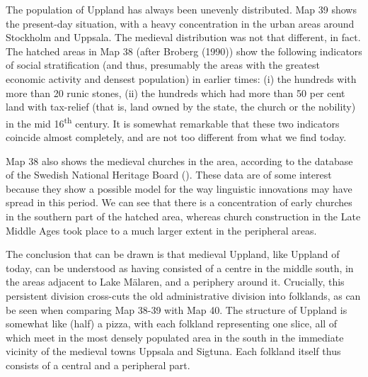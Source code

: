 The population of Uppland has always been unevenly distributed. Map 39 shows the present-day situation, with a heavy concentration in the urban areas around Stockholm and Uppsala. The medieval distribution was not that different, in fact. The hatched areas in Map 38 (after Broberg (1990)) show the following indicators of social stratification (and thus, presumably the areas with the greatest economic activity and densest population) in earlier times: (i) the hundreds with more than 20 runic stones, (ii) the hundreds which had more than 50 per cent land with tax-relief (that is, land owned by the state, the church or the nobility) in the mid 16\textsuperscript{th} century. It is somewhat remarkable that these two indicators coincide almost completely, and are not too different from what we find today. 

Map 38 also shows the medieval churches in the area, according to the database of the Swedish National Heritage Board (\href{http://www.raa.se}{}). These data are of some interest because they show a possible model for the way linguistic innovations may have spread in this period. We can see that there is a concentration of early churches in the southern part of the hatched area, whereas church construction in the Late Middle Ages took place to a much larger extent in the peripheral areas.

The conclusion that can be drawn is that medieval Uppland, like Uppland of today, can be understood as having consisted of a centre in the middle south, in the areas adjacent to Lake Mälaren, and a periphery around it. Crucially, this persistent division cross-cuts the old administrative division into folklands, as can be seen when comparing Map 38-39 with Map 40. The structure of Uppland is somewhat like (half) a pizza, with each folkland representing one slice, all of which meet in the most densely populated area in the south in the immediate vicinity of the medieval towns Uppsala and Sigtuna. Each folkland itself thus consists of a central and a peripheral part. 

